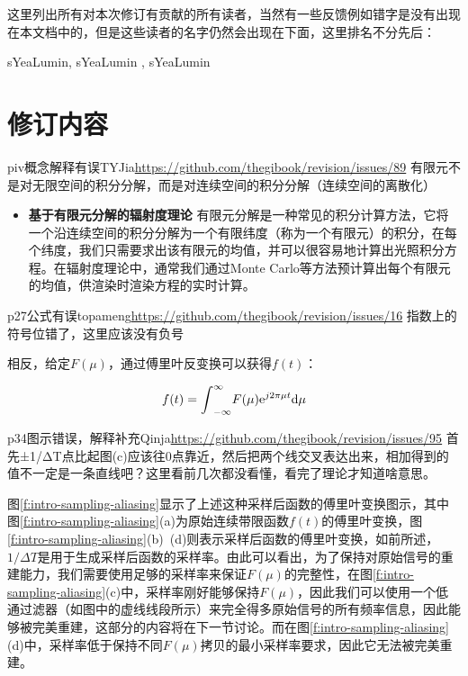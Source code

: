这里列出所有对本次修订有贡献的所有读者，当然有一些反馈例如错字是没有出现在本文档中的，但是这些读者的名字仍然会出现在下面，这里排名不分先后：

sYeaLumin, sYeaLumin , sYeaLumin 





\chapter*{修订内容}
\setcounter{revision}{0}


\begin{revision}{piv}{概念解释有误}{TYJia}{\url{https://github.com/thegibook/revision/issues/89}}
	有限元不是对无限空间的积分分解，而是对连续空间的积分分解（连续空间的离散化）
\end{revision}

\begin{itemize}
	\item \textbf{基于有限元分解的辐射度理论 } 有限元分解是一种常见的积分计算方法，它将一个沿连续空间的积分分解为一个有限纬度（称为一个有限元）的积分，在每个纬度，我们只需要求出该有限元的均值，并可以很容易地计算出光照积分方程。在辐射度理论中，通常我们通过Monte Carlo等方法预计算出每个有限元的均值，供渲染时渲染方程的实时计算。
\end{itemize}



\begin{revision}{p27}{公式有误}{topameng}{\url{https://github.com/thegibook/revision/issues/16}}
指数上的符号位错了，这里应该没有负号
\end{revision}
相反，给定$F(\mu)$，通过傅里叶反变换可以获得$f(t)$：

\begin{equation}
\renewcommand\theequation{1.21}
	f(t)={\rm \int}^{\infty}_{-\infty}F(\mu){\rm e}^{j2\pi\mu t}{\rm d}\mu
\end{equation}




\begin{revision}{p34}{图示错误，解释补充}{Qinja}{\url{https://github.com/thegibook/revision/issues/95}}
	首先±1/ΔT点比起图(c)应该往0点靠近，然后把两个线交叉表达出来，相加得到的值不一定是一条直线吧？这里看前几次都没看懂，看完了理论才知道啥意思。
\end{revision}

图\ref{f:intro-sampling-aliasing}显示了上述这种采样后函数的傅里叶变换图示，其中图\ref{f:intro-sampling-aliasing}(a)为原始连续带限函数$f(t)$的傅里叶变换，图\ref{f:intro-sampling-aliasing}(b)~(d)则表示采样后函数的傅里叶变换，如前所述，$1/\Delta T$是用于生成采样后函数的采样率。由此可以看出，为了保持对原始信号的重建能力，我们需要使用足够的采样率来保证$F(\mu)$的完整性，在图\ref{f:intro-sampling-aliasing}(c)中，采样率刚好能够保持$F(\mu)$，因此我们可以使用一个低通过滤器（如图中的虚线线段所示）来完全得多原始信号的所有频率信息，因此能够被完美重建，这部分的内容将在下一节讨论。而在图\ref{f:intro-sampling-aliasing}(d)中，采样率低于保持不同$F(\mu)$拷贝的最小采样率要求，因此它无法被完美重建。

